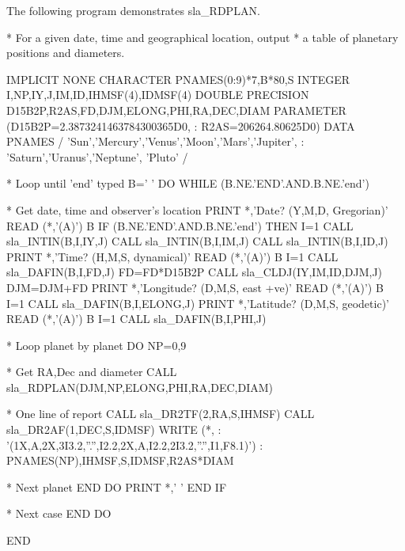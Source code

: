 \documentclass[11pt,twoside,nolof]{starlink}
\begin{document}
The following program demonstrates
sla\_RDPLAN.
\begin{terminalv}
      *  For a given date, time and geographical location, output
      *  a table of planetary positions and diameters.

            IMPLICIT NONE
            CHARACTER PNAMES(0:9)*7,B*80,S
            INTEGER I,NP,IY,J,IM,ID,IHMSF(4),IDMSF(4)
            DOUBLE PRECISION D15B2P,R2AS,FD,DJM,ELONG,PHI,RA,DEC,DIAM
            PARAMETER (D15B2P=2.3873241463784300365D0,
           :           R2AS=206264.80625D0)
            DATA PNAMES / 'Sun','Mercury','Venus','Moon','Mars','Jupiter',
           :              'Saturn','Uranus','Neptune', 'Pluto' /


      *  Loop until 'end' typed
            B=' '
            DO WHILE (B.NE.'END'.AND.B.NE.'end')

      *     Get date, time and observer's location
               PRINT *,'Date? (Y,M,D, Gregorian)'
               READ (*,'(A)') B
               IF (B.NE.'END'.AND.B.NE.'end') THEN
                  I=1
                  CALL sla_INTIN(B,I,IY,J)
                  CALL sla_INTIN(B,I,IM,J)
                  CALL sla_INTIN(B,I,ID,J)
                  PRINT *,'Time? (H,M,S, dynamical)'
                  READ (*,'(A)') B
                  I=1
                  CALL sla_DAFIN(B,I,FD,J)
                  FD=FD*D15B2P
                  CALL sla_CLDJ(IY,IM,ID,DJM,J)
                  DJM=DJM+FD
                  PRINT *,'Longitude? (D,M,S, east +ve)'
                  READ (*,'(A)') B
                  I=1
                  CALL sla_DAFIN(B,I,ELONG,J)
                  PRINT *,'Latitude? (D,M,S, geodetic)'
                  READ (*,'(A)') B
                  I=1
                  CALL sla_DAFIN(B,I,PHI,J)

      *        Loop planet by planet
                  DO NP=0,9

      *           Get RA,Dec and diameter
                     CALL sla_RDPLAN(DJM,NP,ELONG,PHI,RA,DEC,DIAM)

      *           One line of report
                     CALL sla_DR2TF(2,RA,S,IHMSF)
                     CALL sla_DR2AF(1,DEC,S,IDMSF)
                     WRITE (*,
           : '(1X,A,2X,3I3.2,''.'',I2.2,2X,A,I2.2,2I3.2,''.'',I1,F8.1)')
           :                          PNAMES(NP),IHMSF,S,IDMSF,R2AS*DIAM

      *           Next planet
                  END DO
                  PRINT *,' '
               END IF

      *     Next case
            END DO

            END
\end{terminalv}
\end{document}
